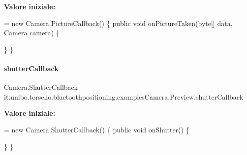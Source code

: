 {\bfseries Valore iniziale\+:}
\begin{DoxyCode}
= \textcolor{keyword}{new} Camera.PictureCallback() \{
        \textcolor{keyword}{public} \textcolor{keywordtype}{void} onPictureTaken(byte[] data, Camera camera) \{
            
        \}
    \}
\end{DoxyCode}
\hypertarget{classit_1_1unibo_1_1torsello_1_1bluetoothpositioning_1_1examplesCamera_1_1Preview_a090d01bab1a7e25e77656d17526d6637_a090d01bab1a7e25e77656d17526d6637}{}\label{classit_1_1unibo_1_1torsello_1_1bluetoothpositioning_1_1examplesCamera_1_1Preview_a090d01bab1a7e25e77656d17526d6637_a090d01bab1a7e25e77656d17526d6637} 
\paragraph{\texorpdfstring{shutter\+Callback}{shutterCallback}}
{\footnotesize\ttfamily Camera.\+Shutter\+Callback it.\+unibo.\+torsello.\+bluetoothpositioning.\+examples\+Camera.\+Preview.\+shutter\+Callback\hspace{0.3cm}{\ttfamily [package]}}

{\bfseries Valore iniziale\+:}
\begin{DoxyCode}
= \textcolor{keyword}{new} Camera.ShutterCallback() \{
        \textcolor{keyword}{public} \textcolor{keywordtype}{void} onShutter() \{
            
        \}
    \}
\end{DoxyCode}
\hypertarget{classit_1_1unibo_1_1torsello_1_1bluetoothpositioning_1_1examplesCamera_1_1Preview_a0e05d509a5425eba210e8d1a816c1d42_a0e05d509a5425eba210e8d1a816c1d42}{}\label{classit_1_1unibo_1_1torsello_1_1bluetoothpositioning_1_1examplesCamera_1_1Preview_a0e05d509a5425eba210e8d1a816c1d42_a0e05d509a5425eba210e8d1a816c1d42} 
